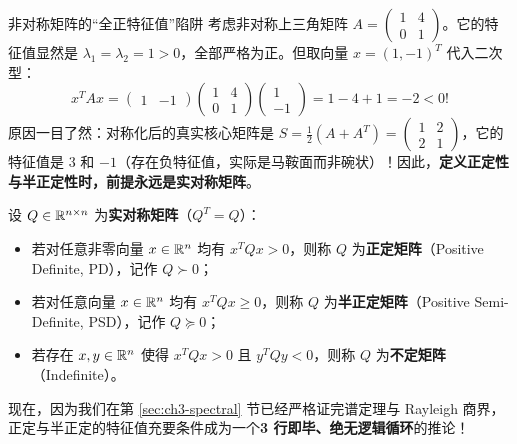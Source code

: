 \begin{failBox}{非对称矩阵的“全正特征值”陷阱}
考虑非对称上三角矩阵 $A = \begin{pmatrix} 1 & 4 \\ 0 & 1 \end{pmatrix}$。它的特征值显然是 $\lambda_1 = \lambda_2 = 1 > 0$，全部严格为正。但取向量 $x = (1, -1)^T$ 代入二次型：
\[
  x^T A x = \begin{pmatrix} 1 & -1 \end{pmatrix} \begin{pmatrix} 1 & 4 \\ 0 & 1 \end{pmatrix} \begin{pmatrix} 1 \\ -1 \end{pmatrix} = 1 - 4 + 1 = -2 < 0!
\]
原因一目了然：对称化后的真实核心矩阵是 $S = \frac{1}{2}(A + A^T) = \begin{pmatrix} 1 & 2 \\ 2 & 1 \end{pmatrix}$，它的特征值是 $3$ 和 $-1$（存在负特征值，实际是马鞍面而非碗状）！因此，\textbf{定义正定性与半正定性时，前提永远是实对称矩阵}。
\end{failBox}

\begin{defBox}
\begin{definition}[正定、半正定与不定矩阵]
\label{def:ch3-psd}
设 $Q \in \mathbb{R}^{n\times n}$ 为\textbf{实对称矩阵}（$Q^T = Q$）：
\begin{itemize}
  \item 若对任意非零向量 $x \in \mathbb{R}^n$ 均有 $x^T Q x > 0$，则称 $Q$ 为\textbf{正定矩阵}（Positive Definite, PD），记作 $Q \succ 0$；
  \item 若对任意向量 $x \in \mathbb{R}^n$ 均有 $x^T Q x \ge 0$，则称 $Q$ 为\textbf{半正定矩阵}（Positive Semi-Definite, PSD），记作 $Q \succeq 0$；
  \item 若存在 $x, y \in \mathbb{R}^n$ 使得 $x^T Q x > 0$ 且 $y^T Q y < 0$，则称 $Q$ 为\textbf{不定矩阵}（Indefinite）。
\end{itemize}
\end{definition}
\end{defBox}

现在，因为我们在第 \ref{sec:ch3-spectral} 节已经严格证完谱定理与 Rayleigh 商界，正定与半正定的特征值充要条件成为一个\textbf{3 行即毕、绝无逻辑循环}的推论！

